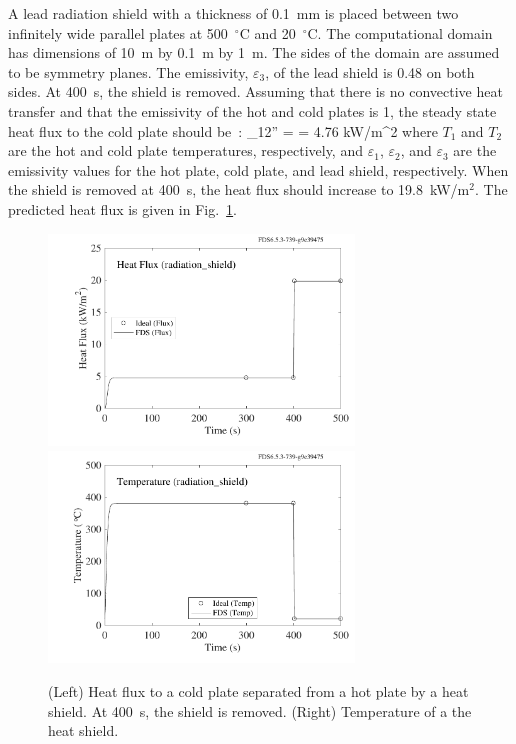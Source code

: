 \documentclass[11pt]{book}
\begin{document}
A lead radiation shield with a thickness of 0.1~mm is placed between two infinitely wide parallel plates at 500~$^\circ$C and 20~$^\circ$C.
The computational domain has dimensions of 10~m by 0.1~m by 1~m. The sides of the domain are assumed to be symmetry planes.
The emissivity, $\varepsilon_{3}$, of the lead shield is 0.48 on both sides.  At 400~s, the shield is removed.
Assuming that there is no convective heat transfer and that the emissivity of the hot and cold plates is 1,
the steady state heat flux to the cold plate should be~\cite{Incropera:1}:
\be
   \dq_{12}'' =  = 4.76 \; \hbox{kW/m}^2
\ee
where $T_{1}$ and $T_{2}$ are the hot and cold plate temperatures, respectively, and $\varepsilon_1$, $\varepsilon_2$, and $\varepsilon_3$ are the
emissivity values for the hot plate, cold plate, and lead shield, respectively. When the shield is removed at 400~s, the heat flux should increase to 19.8~kW/m$^2$.
The predicted heat flux is given in Fig.~\ref{radiation_shield_plot}.
\noindent
\begin{figure}[h]
\includegraphics[width=3.2in]{SCRIPT_FIGURES/radiation_shield_flux}
\includegraphics[width=3.2in]{SCRIPT_FIGURES/radiation_shield_temp}
\caption[Radiation Shield Test Case]{(Left) Heat flux to a cold plate separated from a hot plate by a heat shield. At 400~s, the shield is removed. (Right)
Temperature of a the heat shield.}
\label{radiation_shield_plot}
\end{figure}
\end{document}
